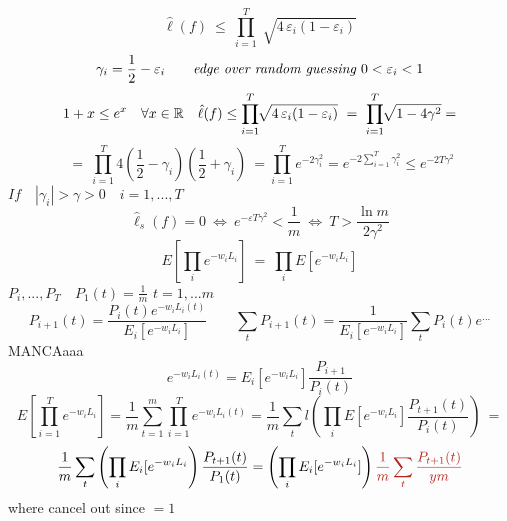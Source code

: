\documentclass[../main.tex]{subfiles}
\begin{document}
$$
\hat{\ell}(f) \ \leq \ \prod_{i=1}^T \sqrt[]{4 \, \varepsilon_i (1-\varepsilon_i)}
$$
$$
\gamma_i = \frac{1}{2} - \varepsilon_i \qquad  \textit{edge over random guessing $ 0 < \varepsilon_i <1$}
$$
$$
1 + x \leq e^x \quad \forall x \in \mathbb{R} \quad \hat{\ell}(f) \leq \prod_{i=1}^T \sqrt[]{4 \, \varepsilon_i(1 - \varepsilon_i)} \ = \
\prod_{i=1}^T \sqrt[]{1- 4 \gamma^2} = 
$$
$$\ = \ \prod_{i = 1}^T 4 (\frac{1}{2} - \gamma_i)(\frac{1}{2}+ \gamma_i) \ = \prod_{i=1}^T e^{- 2 \gamma_i^2}  = e^{- 2 \sum_{i=1}^T \gamma_i^2} \leq e^{-2 T \gamma^2}
$$
$
If \quad |\gamma_i| > \gamma > 0 \quad i = 1, ..., T$
$$
\hat{\ell}_s(f) = 0 \ \Leftrightarrow \ e^{-\varepsilon T \gamma^2}< \frac{1}{m} \ \Leftrightarrow \ T > \frac{ \ln m}{2 \gamma^2}
$$
$$
E \left[ \prod_i e^{-w_i L_i }\right] \ = \ \prod_i E \left[ e^{-w_i L_i } \right]
$$
$P_i,...,P_T \quad P_1(t) = \frac{1}{m}$ \quad $ t = 1,...m$
$$
P_{i+1}(t) = \frac{P_i(t) e^{-w_i L_i(t)}}{E_i \left[ e^{-w_i L_i} \right] } \qquad \sum_t P_{i+1}(t) = \frac{1}{E_i [e^{-w_i L_i}]} 
\sum_t P_i(t) e^{...}
$$
MANCAaaa
$$
e^{-w_i L_i(t)} = E_i [e^{-w_i L_i}] \frac{P_{i+1}}{P_i(t)}
$$
$$
E[\prod_{i=1}^T e^{-w_i L_i}] = \frac{1}{m} \sum_{t=1}^m \prod_{i=1}^T e^{-w_i L_i(t)} = \frac{1}{m} \sum_t l\left( \prod_i E [e^{- w_i L_i}] \frac{P_{t+1}(t)}{P_i(t)}\right) \ = 
$$
$$
\frac{1}{m} \sum_t \left( \prod_i E_i [e^{-w_i L_i} \right) \frac{P_{t+1}(t)}{P_1(t)} = \left( \prod_i E_i[e^{-w_i L_i}] \right) \red{\frac{1}{m} \sum_t \frac{P_{t+1}(t)}{y m}}
$$
where  cancel out since $= 1$
\newpage
\end{document}
